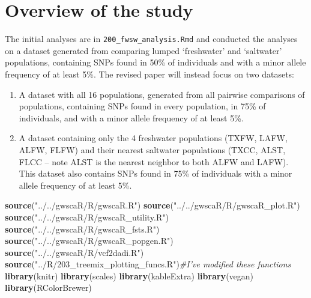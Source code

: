 \documentclass[11pt,]{article}
\newenvironment{Shaded}{\begin{snugshade}}{\end{snugshade}}
\newcommand{\KeywordTok}[1]{\textcolor[rgb]{0.13,0.29,0.53}{\textbf{#1}}}
\newcommand{\StringTok}[1]{\textcolor[rgb]{0.31,0.60,0.02}{#1}}
\newcommand{\CommentTok}[1]{\textcolor[rgb]{0.56,0.35,0.01}{\textit{#1}}}
\newcommand{\NormalTok}[1]{#1}
\begin{document}
\section*{Overview of the study}\label{overview-of-the-study}

The initial analyses are in \texttt{200\_fwsw\_analysis.Rmd} and
conducted the analyses on a dataset generated from comparing lumped
`freshwater' and `saltwater' populations, containing SNPs found in 50\%
of individuals and with a minor allele frequency of at least 5\%. The
revised paper will instead focus on two datasets:

\begin{enumerate}
\def\labelenumi{\arabic{enumi}.}
\item
  A dataset with all 16 populations, generated from all pairwise
  comparisons of populations, containing SNPs found in every population,
  in 75\% of individuals, and with a minor allele frequency of at least
  5\%.
\item
  A dataset containing only the 4 freshwater populations (TXFW, LAFW,
  ALFW, FLFW) and their nearest saltwater populations (TXCC, ALST, FLCC
  -- note ALST is the nearest neighbor to both ALFW and LAFW). This
  dataset also contains SNPs found in 75\% of individuals with a minor
  allele frequency of at least 5\%.
\end{enumerate}

\begin{Shaded}
\begin{Highlighting}[]
\KeywordTok{source}\NormalTok{(}\StringTok{"../../gwscaR/R/gwscaR.R"}\NormalTok{)}
\KeywordTok{source}\NormalTok{(}\StringTok{"../../gwscaR/R/gwscaR_plot.R"}\NormalTok{)}
\KeywordTok{source}\NormalTok{(}\StringTok{"../../gwscaR/R/gwscaR_utility.R"}\NormalTok{)}
\KeywordTok{source}\NormalTok{(}\StringTok{"../../gwscaR/R/gwscaR_fsts.R"}\NormalTok{)}
\KeywordTok{source}\NormalTok{(}\StringTok{"../../gwscaR/R/gwscaR_popgen.R"}\NormalTok{)}
\KeywordTok{source}\NormalTok{(}\StringTok{"../../gwscaR/R/vcf2dadi.R"}\NormalTok{)}
\KeywordTok{source}\NormalTok{(}\StringTok{"../R/203_treemix_plotting_funcs.R"}\NormalTok{)}\CommentTok{#I've modified these functions}
\KeywordTok{library}\NormalTok{(knitr)}
\KeywordTok{library}\NormalTok{(scales)}
\KeywordTok{library}\NormalTok{(kableExtra)}
\KeywordTok{library}\NormalTok{(vegan)}
\KeywordTok{library}\NormalTok{(RColorBrewer)}
\end{Highlighting}
\end{Shaded}
\end{document}
